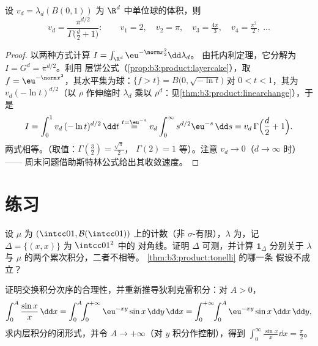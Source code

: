 \begin{theorem}[单位球的体积]
\label{thm:b3:product:ballvolume}
设 $v_d = \lambda_d(B(0,1))$ 为 $\R^d$ 中单位球的体积，则
\[
v_d = \frac{\pi^{d/2}}{\Gamma\bigl(\frac d2 + 1\bigr)} :
\qquad
v_1 = 2,\quad v_2 = \pi,\quad v_3 = \tfrac{4\pi}3,\quad
v_4 = \tfrac{\pi^2}2,\ \dots
\]
\end{theorem}

\begin{proof}
以两种方式计算 $I = \int_{\R^d}\eu^{-\norm x_2^2}\dd\lambda_d$。
由托内利定理，它分解为 $I = G^d = \pi^{d/2}$。利用
层饼公式（\cref{prop:b3:product:layercake}），取 $f = \eu^{-
\norm x^2}$，其水平集为球：$\{f > t\} =
B\bigl(0, \sqrt{-\ln t}\bigr)$ 对 $0 < t < 1$，其为
$v_d(-\ln t)^{d/2}$（以 $\rho$ 作伸缩时 $\lambda_d$ 乘以
$\rho^d$：见\cref{thm:b3:product:linearchange}），于是
\[
I = \int_0^1 v_d\,(-\ln t)^{d/2}\,\dd t
\overset{t = \eu^{-s}}{=}
v_d\int_0^\infty s^{d/2}\eu^{-s}\,\dd s
= v_d\,\Gamma\Bigl(\frac d2 + 1\Bigr).
\]
两式相等。（取值：$\Gamma(\frac32) = \frac{\sqrt\pi}2$，
$\Gamma(2) = 1$ 等）。注意 $v_d \to 0$（$d \to \infty$ 时）——
周末问题借助斯特林公式给出其收敛速度。
\end{proof}

\section{练习}

\begin{exercise}[$\star$]\label{exo:b3:product:1}
设 $\mu$ 为 $(\intcc01, \mathcal
B(\intcc01))$ 上的计数（非 $\sigma$-有限），$\lambda$ 为，记 $\Delta = \{(x,x)\}$ 为 $\intcc01^2$ 中的
对角线。证明 $\Delta$ 可测，并计算 $\mathbf 1_\Delta$ 分别关于
$\lambda$ 与 $\mu$ 的两个累次积分，二者不相等。
\cref{thm:b3:product:tonelli} 的哪一条
假设不成立？
\end{exercise}

\begin{exercise}[$\star$]\label{exo:b3:product:2}
证明交换积分次序的合理性，并重新推导狄利克雷积分：对
$A > 0$，
\[
\int_0^A\frac{\sin x}x\,\dd x
= \int_0^A\!\!\int_0^{+\infty}\eu^{-xy}\sin x\,\dd y\,\dd x
= \int_0^{+\infty}\!\!\int_0^A \eu^{-xy}\sin x\,\dd x\,\dd y,
\]
求内层积分的闭形式，并令 $A \to
+\infty$（对 $y$ 积分作控制），得到
$\int_0^\infty\frac{\sin x}x\dd x = \frac\pi2$。
\end{exercise}

